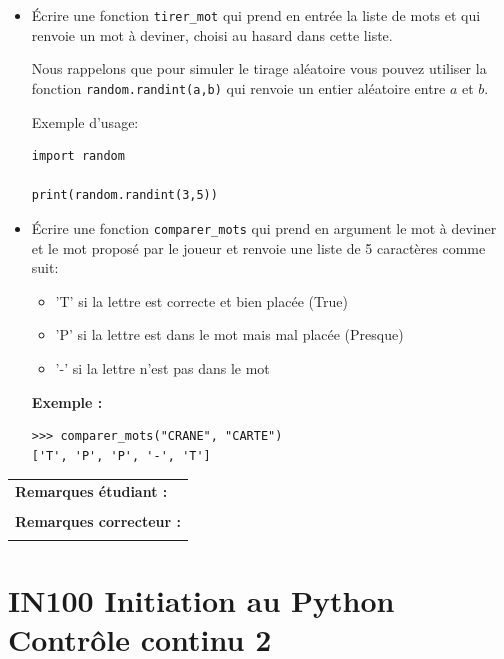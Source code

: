 \documentclass[a4paper,11pt]{article}
\begin{document}
\begin{itemize}
\item[1.] Écrire une fonction   \texttt{tirer\_mot} qui prend en entrée la liste de mots et 
   qui renvoie un mot à deviner, choisi au hasard dans cette liste. 
   
Nous rappelons que pour simuler le tirage aléatoire vous pouvez utiliser la fonction \texttt{random.randint(a,b)} qui renvoie un entier aléatoire entre $a$ et $b$. 

Exemple d'usage: 
\vspace*{-0.2 cm}
\begin{verbatim}
import random

print(random.randint(3,5))
\end{verbatim}
\vspace*{-0.4 cm}
\item[2.] Écrire une fonction \texttt{comparer\_mots} qui prend en argument le mot à deviner
    et le mot proposé par le joueur et 
    renvoie une liste de 5 caractères comme suit:
    \begin{itemize}
     \item  'T' si la lettre est correcte et bien placée (True)
     \item  'P' si la lettre est dans le mot mais mal placée (Presque)
    \item   '-' si la lettre n'est pas dans le mot
\end{itemize}
\textbf{Exemple :}
\vspace*{-0.4 cm}
\begin{verbatim}
>>> comparer_mots("CRANE", "CARTE")
['T', 'P', 'P', '-', 'T']
\end{verbatim}
\end{itemize}

\vspace*{-0.3 cm}
\begin{table}[h!]
\centering
\renewcommand{\arraystretch}{1.4} %
\begin{tabular}{|p{15cm}|}
\hline
\textbf{Remarques étudiant :}    \\
 \\
\hline
\textbf{Remarques correcteur :}  \\
 \\
\hline
\end{tabular}
\end{table}


\newpage

\section*{\center IN100 Initiation au Python\\
Contrôle continu 2}
\end{document}
